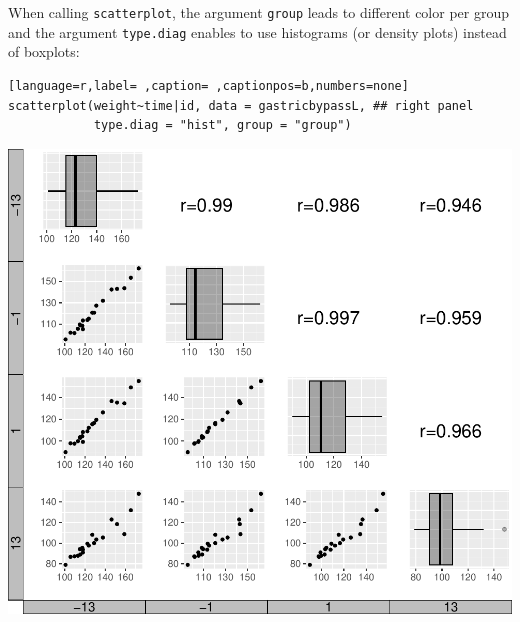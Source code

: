 \documentclass[12pt]{article}
\begin{document}
When calling \texttt{scatterplot}, the argument \texttt{group} leads to different
color per group and the argument \texttt{type.diag} enables to use histograms
(or density plots) instead of boxplots:
\begin{lstlisting}[language=r,label= ,caption= ,captionpos=b,numbers=none]
scatterplot(weight~time|id, data = gastricbypassL, ## right panel
            type.diag = "hist", group = "group")
\end{lstlisting}


\bigskip

\begin{minipage}{0.48\linewidth}
\begin{center}
\includegraphics[trim={0 0 0 0},width=\textwidth]{./figures/scatterplot.pdf}
\end{center}
\end{minipage}
\end{document}
